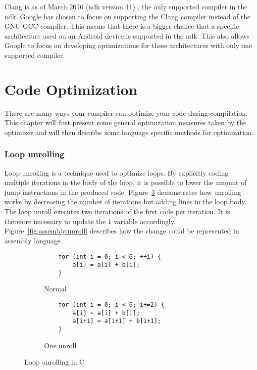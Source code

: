 Clang is as of March 2016 (\gls{ndk} version 11) \cite{android:ndk:revision}, the only supported compiler in the \gls{ndk}. Google has chosen to focus on supporting the Clang compiler instead of the GNU GCC compiler. This means that there is a bigger chance that a specific architecture used on an Android device is supported in the \gls{ndk}. This also allows Google to focus on developing optimizations for these architectures with only one supported compiler.


\section{Code Optimization}

There are many ways your compiler can optimize your code during compilation. This chapter will first present some general optimization measures taken by the optimizer and will then describe some language specific methods for optimization.

\subsubsection{Loop unrolling}
Loop unrolling is a technique used to optimize loops. By explicitly coding multiple iterations in the body of the loop, it is possible to lower the amount of jump instructions in the produced code. Figure~\ref{fig:c:unroll} demonstrates how unrolling works by decreasing the number of iterations but adding lines in the loop body. The loop unroll executes two iterations of the first code per iteration. It is therefore necessary to update the \texttt{i} variable accordingly. Figure~\ref{fig:assembly:unroll} describes how the change could be represented in assembly language.

\begin{figure}
    \centering
    \begin{subfigure}{.5\textwidth}
        \centering
        \begin{verbatim}
    for (int i = 0; i < 6; ++i) {
        a[i] = a[i] + b[i];
    }

        \end{verbatim}
        \caption{Normal}
        \label{fig:c:unroll:normal}
    \end{subfigure}%
    \begin{subfigure}{.5\textwidth}
        \centering
        \begin{verbatim}
    for (int i = 0; i < 6; i+=2) {
        a[i] = a[i] + b[i];
        a[i+1] = a[i+1] + b[i+1];
    }
        \end{verbatim}
        \caption{One unroll}
        \label{fig:c:unroll:unroll}
    \end{subfigure}
    \caption{Loop unrolling in C}
    \label{fig:c:unroll}
\end{figure}

